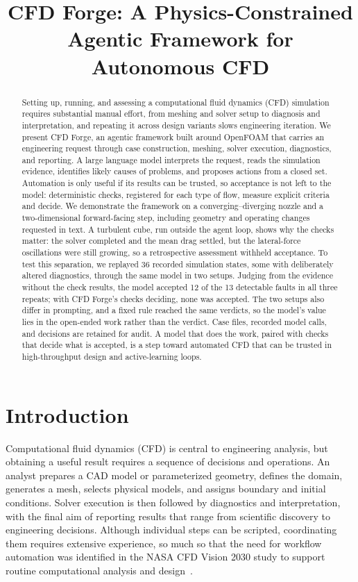 \documentclass[11pt]{article}
\title{CFD Forge: A Physics-Constrained Agentic Framework for Autonomous CFD}
\date{}
\begin{document}
\maketitle

\begin{abstract}
Setting up, running, and assessing a computational fluid dynamics (CFD) simulation requires substantial manual effort, from meshing and solver setup to diagnosis and interpretation, and repeating it across design variants slows engineering iteration. We present CFD Forge, an agentic framework built around OpenFOAM that carries an engineering request through case construction, meshing, solver execution, diagnostics, and reporting. A large language model interprets the request, reads the simulation evidence, identifies likely causes of problems, and proposes actions from a closed set. Automation is only useful if its results can be trusted, so acceptance is not left to the model: deterministic checks, registered for each type of flow, measure explicit criteria and decide. We demonstrate the framework on a converging--diverging nozzle and a two-dimensional forward-facing step, including geometry and operating changes requested in text. A turbulent cube, run outside the agent loop, shows why the checks matter: the solver completed and the mean drag settled, but the lateral-force oscillations were still growing, so a retrospective assessment withheld acceptance. To test this separation, we replayed 36 recorded simulation states, some with deliberately altered diagnostics, through the same model in two setups. Judging from the evidence without the check results, the model accepted 12 of the 13 detectable faults in all three repeats; with CFD Forge's checks deciding, none was accepted. The two setups also differ in prompting, and a fixed rule reached the same verdicts, so the model's value lies in the open-ended work rather than the verdict. Case files, recorded model calls, and decisions are retained for audit. A model that does the work, paired with checks that decide what is accepted, is a step toward automated CFD that can be trusted in high-throughput design and active-learning loops.
\end{abstract}

\section{Introduction}

Computational fluid dynamics (CFD) is central to engineering analysis, but obtaining a useful result requires a sequence of decisions and operations. An analyst prepares a CAD model or parameterized geometry, defines the domain, generates a mesh, selects physical models, and assigns boundary and initial conditions. Solver execution is then followed by diagnostics and interpretation, with the final aim of reporting results that range from scientific discovery to engineering decisions. Although individual steps can be scripted, coordinating them requires extensive experience, so much so that the need for workflow automation was identified in the NASA CFD Vision 2030 study to support routine computational analysis and design~\cite{slotnick2014vision}.
\end{document}
